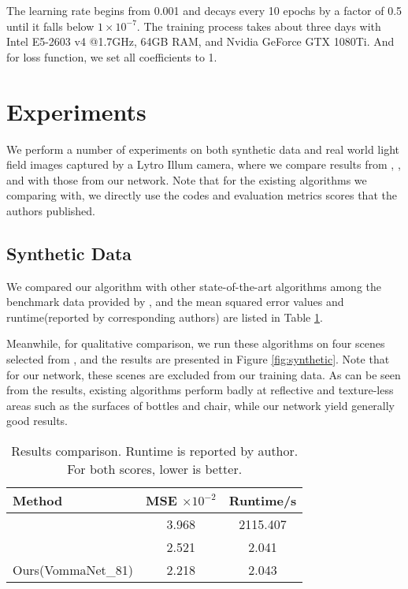 \documentclass[10pt,twocolumn,letterpaper]{article}
\begin{document}
The learning rate begins from 0.001 and decays every 10 epochs by a factor of 0.5 until it falls below $1\times10^{-7}$. The training process takes about three days with Intel E5-2603 v4 @1.7GHz, 64GB RAM, and Nvidia GeForce GTX 1080Ti. And for loss function, we set all coefficients to 1.

\section{Experiments}

We perform a number of experiments on both synthetic data and real world light field images captured by a Lytro Illum camera, where we compare results from \cite{jeon2015accurate}, \cite{zhang2016robust}, and \cite{shin2018epinet} with those from our network. Note that for the existing algorithms we comparing with, we directly use the codes and evaluation metrics scores that the authors published.

\subsection{Synthetic Data}

We compared our algorithm with other state-of-the-art algorithms among the benchmark data provided by \cite{honauer2016dataset}, and the mean squared error values and runtime(reported by corresponding authors) are listed in Table \ref{table:results}.

Meanwhile, for qualitative comparison, we run these algorithms on four scenes selected from \cite{alperovich2018light}, and the results are presented in Figure \ref{fig:synthetic}. Note that for our network, these scenes are excluded from our training data. As can be seen from the results, existing algorithms perform badly at reflective and texture-less areas such as the surfaces of bottles and chair, while our network yield generally good results.

\begin{table}
	\begin{center}
		\begin{tabular}{|l|c|c|}
			\hline
			Method & MSE $\times10^{-2}$ & Runtime/s \\
			\hline\hline
			\cite{zhang2016robust} & 3.968 & 2115.407\\
			\cite{shin2018epinet} & 2.521 & 2.041\\
			Ours(VommaNet\_81) & 2.218 & 2.043\\
			\hline
		\end{tabular}
	\end{center}
	\caption{Results comparison. Runtime is reported by author. For both scores, lower is better.}
	\label{table:results}
\end{table}
\end{document}
